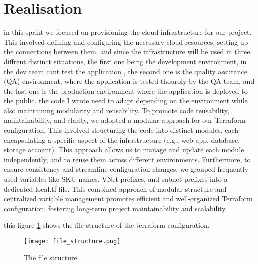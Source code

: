 \section{Realisation}
in this sprint we focused on provisioning the cloud infrastructure for our project. This involved defining and configuring the necessary cloud resources, setting up the connections between them.
and since the infrastructure will be used in three diffrent distinct situations, the first one being the development environment, in the dev team cant test the application , the second one is the quality assurance (QA) environment, where the application is tested thouroly by the QA team, and the last one is the production environment where the application is deployed to the public.
the code I wrote need to adapt depending on the environment while also maintaining modularity and reusability.
To promote code reusability, maintainability, and clarity, we adopted a modular approach for our Terraform configuration. This involved structuring the code into distinct modules, each encapsulating a specific aspect of the infrastructure (e.g., web app, database, storage account). This approach allows us to manage and update each module independently, and to reuse them across different environments.
Furthermore, to ensure consistency and streamline configuration changes, we grouped frequently used variables like SKU names, VNet prefixes, and subnet prefixes into a dedicated local.tf file.
This combined approach of modular structure and centralized variable management promotes efficient and well-organized Terraform configuration, fostering long-term project maintainability and scalability.

this figure \ref{fig:file_structure} shows the file structure of the terraform configuration.

\begin{figure}[H]
    \centering
    \texttt{[image: file\_structure.png]}
    \caption{The file structure}
    \label{fig:file_structure}
\end{figure}

